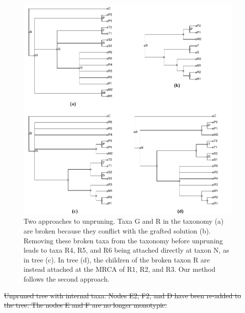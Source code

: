 \documentclass[fleqn,12pt,lineno,english]{wlpeerj}
\newcommand{\lyxdot}{.}
\providecommand{\DIFdeltex}[1]{{\protect\color{red}\sout{#1}}}                      %
\providecommand{\DIFdelbegin}{} %
\providecommand{\DIFdelFL}[1]{\DIFdel{#1}} %
\providecommand{\DIFaddendFL}{} %
\providecommand{\DIFdel}[1]{\texorpdfstring{\DIFdeltex{#1}}{}} %
\begin{document}
\begin{figure}
\includegraphics[width=1.0\textwidth]{Fig12}  

\caption{\DIFaddendFL \label{fig:Two-approaches-to-unpruning}Two approaches to unpruning.
Taxa G and R in the taxonomy (a) are broken because they conflict
with the grafted solution (b). Removing these broken taxa from the
taxonomy before unpruning leads to taxa R4, R5, and R6 being attached
directly at taxon N, as in tree (c). In tree (d), the children of
the broken taxon R are instead attached at the MRCA of R1, R2, and
R3. Our method follows the second approach.}
\end{figure}


\DIFdelbegin %
\DIFdelFL{Unpruned tree with internal taxa. Nodes E2, F2, and D have been re-added
to the tree. The nodes E and F are no longer monotypic.}%
\end{document}
